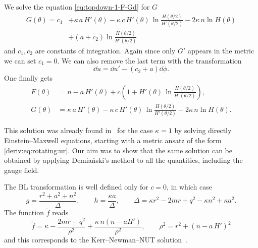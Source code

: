 We solve the equation \eqref{eq:topdown-1-F-Gd} for $G$
\begin{equation}
	\begin{aligned}
		G(\theta) = c_1 &+ \kappa\, a\, H'(\theta)
			- \kappa\, c\, H'(\theta)\, \ln \frac{H(\theta/2)}{H'(\theta/2)}
			- 2 \kappa\, n \ln H(\theta) \\
			&+ (a + c_2) \ln \frac{H(\theta/2)}{H'(\theta/2)}
	\end{aligned}
\end{equation} 
and $c_1, c_2$ are constants of integration.
Again since only $G'$ appears in the metric we can set $c_1 = 0$.
We can also remove the last term with the transformation
\begin{equation}
	\dd u = \dd u' - (c_2 + a) \dd\phi.
\end{equation} 
One finally gets
\begin{subequations}
\begin{align}
	F(\theta) &= n - a\, H'(\theta) + c \left( 1 + H'(\theta)\, \ln \frac{H(\theta/2)}{H'(\theta/2)} \right), \\
	G(\theta) &= \kappa\, a\, H'(\theta)
		- \kappa\, c\, H'(\theta)\, \ln \frac{H(\theta/2)}{H'(\theta/2)}
		- 2 \kappa\, n \ln H(\theta).
\end{align}
\end{subequations}

This solution was already found in~\cite{Krori:1981:ChargedDemianskiMetric} for the case $\kappa = 1$ by solving directly Einstein--Maxwell equations, starting with a metric ansatz of the form \eqref{deriv:eq:rotating:ur}.
Our aim was to show that the same solution can be obtained by applying Demiański's method to all the quantities, including the gauge field.

The BL transformation is well defined only for $c = 0$, in which case
\begin{equation}
	g = \frac{r^2 + a^2 + n^2}{\Delta}, \qquad
	h = \frac{\kappa a}{\Delta}, \qquad
	\Delta = \kappa r^2 - 2 m r + q^2 - \kappa n^2 + \kappa a^2.
\end{equation} 
The function $\tilde f$ reads
\begin{equation}
	\label{eq:topdown-1:tilde-f-no-Lambda-no-c}
	\tilde f = \kappa - \frac{2 m r - q^2}{\rho^2} + \frac{\kappa\, n (n - a H')}{\rho^2}, \qquad
	\rho^2 = r^2 + (n - a\, H')^2
\end{equation} 
and this corresponds to the Kerr--Newman--NUT solution~\cite[sec.~2.2]{AlonsoAlberca:2000:SupersymmetryTopologicalKerrNewmannTaubNUTaDS}.



